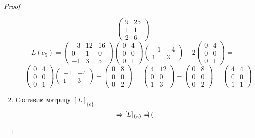 \documentclass[11pt, fleqn]{article}
\begin{document}
\begin{proof}
\begin{enumerate}
\[\begin{pmatrix}
      9 & 25\\
      1 & 1\\
      2 & 6
    \end{pmatrix}\]
    \[L(e_5) = \begin{pmatrix}
      -3 & 12 & 16\\
      0 & 1 & 0\\
      -1 & 3 & 5
    \end{pmatrix} \begin{pmatrix}
      0 & 4\\
      0 & 0\\
      0 & 1
    \end{pmatrix} \begin{pmatrix}
      -1 & -4\\
      1 & 3
    \end{pmatrix} - 2 \begin{pmatrix}
      0 & 4\\
      0 & 0\\
      0 & 1
    \end{pmatrix} =\]
    \[= \begin{pmatrix}
      0 & 4\\
      0 & 0\\
      0 & 1
    \end{pmatrix} \begin{pmatrix}
      -1 & -4\\
      1 & 3
    \end{pmatrix} - \begin{pmatrix}
      0 & 8\\
      0 & 0\\
      0 & 2
    \end{pmatrix} = \begin{pmatrix}
      4 & 12\\
      0 & 0\\
      1 & 3
    \end{pmatrix} - \begin{pmatrix}
      0 & 8\\
      0 & 0\\
      0 & 2
    \end{pmatrix} = \begin{pmatrix}
      4 & 4\\
      0 & 0\\
      1 & 1
    \end{pmatrix}\]
    \item Составим матрицу $[L]_{\{e\}}$
    \[\Rightarrow [L]_{\{e\}} = \begin{pmatrix}

\end{pmatrix}\]
\end{enumerate}
\end{proof}
\end{document}
